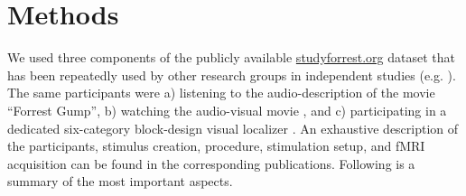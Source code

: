 \documentclass[english]{article}
\begin{document}


\section{Methods}


We used three components of the publicly available
\href{http://www.studyforrest.org}{studyforrest.org} dataset that has
been repeatedly used by other research groups in independent studies (e.g.
\citep{ben2018hippocampal, jiahui2019predicting, hu2017decoding,
lettieri2019emotionotopy, nguyen2016integration}).
The same participants were
a) listening to the audio-description \citep{hanke2014audiomovie} of
the movie ``Forrest Gump'',
b) watching the audio-visual movie \citep{hanke2016simultaneous}, and
c) participating in a dedicated six-category block-design visual localizer \citep{sengupta2016extension}.
An exhaustive description of the participants, stimulus creation, procedure,
stimulation setup, and fMRI acquisition can be found in the corresponding
publications. Following is a summary of the most important aspects.
\end{document}
